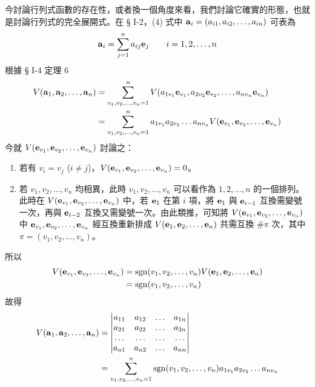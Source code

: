 今討論行列式函數的存在性，或者換一個角度來看，我們討論它確實的形態，也就是討論行列式的完全展開式。在 § I-2，(4) 式中 $\boldsymbol{\mathbf{a}}_i=(a_{i1}, a_{i2}, \dots, a_{in})$ 可表為
\begin{equation}
\boldsymbol{\mathbf{a}}_i = \sum_{j=1}^n a_{ij} \boldsymbol{\mathbf{e}}_j \qquad i=1, 2, \dots, n \label{eq:b6s-1-5-1}
\end{equation}
根據 § I-4 定理 6
\begin{align}
V(\boldsymbol{\mathbf{a}}_1, \boldsymbol{\mathbf{a}}_2, \dots, \boldsymbol{\mathbf{a}}_n) &= \sum_{v_1, v_2, \dots, v_n=1}^n V(a_{1v_1} \boldsymbol{\mathbf{e}}_{v_1}, a_{2v_2} \boldsymbol{\mathbf{e}}_{v_2}, \dots, a_{nv_n} \boldsymbol{\mathbf{e}}_{v_n}) \notag \\
&= \sum_{v_1, v_2, \dots, v_n=1}^n a_{1v_1} a_{2v_2} \dots a_{nv_n} V(\boldsymbol{\mathbf{e}}_{v_1}, \boldsymbol{\mathbf{e}}_{v_2}, \dots, \boldsymbol{\mathbf{e}}_{v_n}) \label{eq:b6s-1-5-2}
\end{align}
今就 $V(\boldsymbol{\mathbf{e}}_{v_1}, \boldsymbol{\mathbf{e}}_{v_2}, \dots, \boldsymbol{\mathbf{e}}_{v_n})$ 討論之：
\begin{enumerate}[label=(\arabic*), leftmargin=2em]
  \item 若有 $v_i = v_j$ ($i \ne j$)，$V(\boldsymbol{\mathbf{e}}_{v_1}, \boldsymbol{\mathbf{e}}_{v_2}, \dots, \boldsymbol{\mathbf{e}}_{v_n}) = 0$。
  \item 若 $v_1, v_2, \dots, v_n$ 均相異，此時 $v_1, v_2, \dots, v_n$ 可以看作為 $1, 2, \dots, n$ 的一個排列。此時在 $V(\boldsymbol{\mathbf{e}}_{v_1}, \boldsymbol{\mathbf{e}}_{v_2}, \dots, \boldsymbol{\mathbf{e}}_{v_n})$ 中，若 $\boldsymbol{\mathbf{e}}_1$ 在第 $i$ 項，將 $\boldsymbol{\mathbf{e}}_1$ 與 $\boldsymbol{\mathbf{e}}_{i-1}$ 互換需變號一次，再與 $\boldsymbol{\mathbf{e}}_{i-2}$ 互換又需變號一次。由此類推，可知將 $V(\boldsymbol{\mathbf{e}}_{v_1}, \boldsymbol{\mathbf{e}}_{v_2}, \dots, \boldsymbol{\mathbf{e}}_{v_n})$ 中 $\boldsymbol{\mathbf{e}}_{v_1}, \boldsymbol{\mathbf{e}}_{v_2}, \dots, \boldsymbol{\mathbf{e}}_{v_n}$ 經互換重新排成 $V(\boldsymbol{\mathbf{e}}_1, \boldsymbol{\mathbf{e}}_2, \dots, \boldsymbol{\mathbf{e}}_n)$ 共需互換 $\#\pi$ 次，其中 $\pi=(v_1, v_2, \dots, v_n)$。
\end{enumerate}
所以
\begin{align}
V(\boldsymbol{\mathbf{e}}_{v_1}, \boldsymbol{\mathbf{e}}_{v_2}, \dots, \boldsymbol{\mathbf{e}}_{v_n}) &= \operatorname{sgn}(v_1, v_2, \dots, v_n) V(\boldsymbol{\mathbf{e}}_1, \boldsymbol{\mathbf{e}}_2, \dots, \boldsymbol{\mathbf{e}}_n) \notag \\
&= \operatorname{sgn}(v_1, v_2, \dots, v_n) \label{eq:b6s-1-5-3}
\end{align}
故得
\begin{align}
V(\boldsymbol{\mathbf{a}}_1, \boldsymbol{\mathbf{a}}_2, \dots, \boldsymbol{\mathbf{a}}_n) &= \begin{vmatrix}
a_{11} & a_{12} & \dots & a_{1n} \\
a_{21} & a_{22} & \dots & a_{2n} \\
\dots & \dots & \dots & \dots \\
a_{n1} & a_{n2} & \dots & a_{nn}
\end{vmatrix} \notag \\
&= \sum_{v_1, v_2, \dots, v_n=1}^n \operatorname{sgn}(v_1, v_2, \dots, v_n) a_{1v_1} a_{2v_2} \dots a_{nv_n} \label{eq:b6s-1-5-4}
\end{align}

